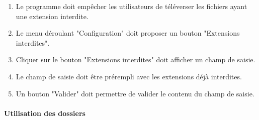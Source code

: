 \documentclass[10pt,a4paper]{report}
\begin{document}
\begin{enumerate}
		\item Le programme doit empêcher les utilisateurs de téléverser les fichiers ayant une extension interdite.
		\item Le menu déroulant "Configuration" doit proposer un bouton "Extensions interdites".
		\item Cliquer sur le bouton "Extensions interdites" doit afficher un champ de saisie.
		\item Le champ de saisie doit être prérempli avec les extensions déjà interdites.
		\item Un bouton "Valider" doit permettre de valider le contenu du champ de saisie.
	\end{enumerate}
	
\paragraph{Utilisation des dossiers}
\end{document}
